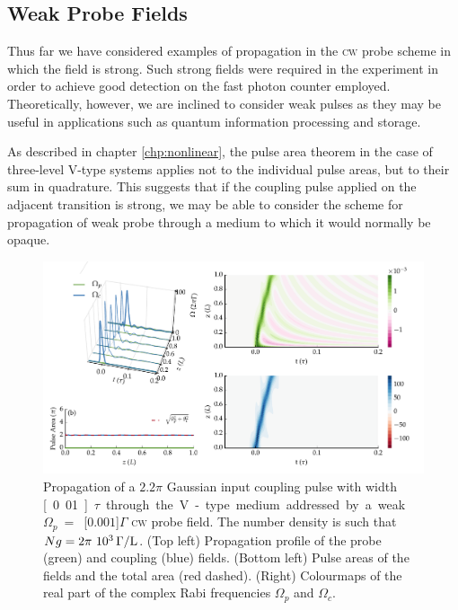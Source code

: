   \subsection{Weak Probe Fields}

    Thus far we have considered examples of propagation in the \textsc{cw} probe
    scheme in which the field is strong. Such strong fields were required in the
    experiment in order to achieve good detection on the fast photon counter
    employed. Theoretically, however, we are inclined to consider weak pulses as
    they may be useful in applications such as quantum information processing
    and storage.

    As described in chapter \ref{chp:nonlinear}, the pulse area theorem in the
    case of three-level V-type systems applies not to the individual pulse
    areas, but to their sum in quadrature. This suggests that if the coupling
    pulse applied on the adjacent transition is strong, we may be able to
    consider the scheme for propagation of weak probe through a medium to which
    it would normally be opaque.

    \begin{figure}[]
      \includegraphics[width=\linewidth]
        {figs/06_simultons/mb_vee_wpsit_plot_001c_22pip_Ng1e3_fig1.pdf}
      \caption{
      Propagation of a $2.2\pi$ Gaussian input coupling pulse with width
      \unit[0.01]{$\tau$} through the V-type medium addressed by a weak
      $\Omega_p~=$~\unit[$0.001$]{$\Gamma$} \textsc{cw} probe field. The number
      density is such that $Ng = \unit[2\pi~10^3]{\Gamma/L}$. (Top left)
      Propagation profile of the probe (green) and coupling (blue) fields.
      (Bottom left) Pulse areas of the fields and the total area (red dashed).
      (Right) Colourmaps of the real part of the complex Rabi frequencies
      $\Omega_p$ and $\Omega_c$.
      } 
      \label{fig:wp_propagation} 
    \end{figure}

